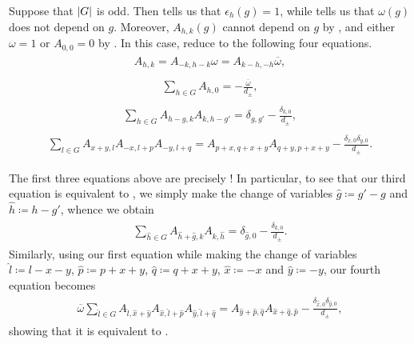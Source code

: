 \noindent\begin{remark} Suppose that $\lvert G\rvert$ is odd. Then \cite[Equation (4.1)]{Izu18} tells us that $\epsilon_h(g) = 1$, while \cite[Equation (4.2)]{Izu18} tells us that $\omega(g)$ does not depend on $g$. Moreover, $A_{h,k}(g)$ cannot depend on $g$ by \cite[Equation (4.5)]{Izu18}, and either $\omega = 1$ or $A_{0,0} = 0$ by \cite[Equation (4.7)]{Izu18}. In this case, \cite[Equations (4.1)--(4.9)]{Izu18} reduce to the following four equations.
\begin{align*}
\begin{split}
A_{h,k} = A_{-k,h-k}\omega = A_{k-h,-h}\overline{\omega},
\end{split}
\end{align*}
\begin{align*}
\begin{split}
\sum_{h \in G} A_{h,0} = -\frac{\overline{\omega}}{d_\pm},
\end{split}
\end{align*}
\begin{align*}
\begin{split}
\sum_{h \in G} A_{h-g,k} A_{k,h-g'} = \delta_{g,g'} - \frac{\delta_{k,0}}{d_\pm},
\end{split}
\end{align*}
\begin{align*}
\begin{split}
\sum_{l \in G} A_{x+y,l} A_{-x,l+p} A_{-y,l+q} = A_{p+x,q+x+y} A_{q+y,p+x+y} - \frac{\delta_{x,0}\delta_{y,0}}{d_\pm}.
\end{split}
\end{align*}
\end{remark}
\noindent The first three equations above are precisely \cite[Equations (4.7)--(4.9)]{EG17}! In particular, to see that our third equation is equivalent to \cite[Equation (4.9)]{EG17}, we simply make the change of variables $\hat{g} \coloneqq g' - g$ and $\hat{h} \coloneqq h - g'$, whence we obtain
\begin{align*}
\begin{split}
\sum_{\hat{h} \in G} A_{\hat{h}+\hat{g},k} A_{k,\hat{h}} = \delta_{\hat{g},0} - \frac{\delta_{k,0}}{d_\pm}.
\end{split}
\end{align*}
\noindent Similarly, using our first equation while making the change of variables $\hat{l} \coloneqq l-x-y$, $\hat{p} \coloneqq p+x+y$, $\hat{q} \coloneqq q+x+y$, $\hat{x} \coloneqq -x$ and $\hat{y} \coloneqq -y$, our fourth equation becomes
\begin{align*}
\begin{split}
\overline{\omega}\sum_{\hat{l} \in G} A_{\hat{l},\hat{x}+\hat{y}} A_{\hat{x},\hat{l}+\hat{p}} A_{\hat{y},\hat{l}+\hat{q}} = A_{\hat{y}+\hat{p},\hat{q}} A_{\hat{x}+\hat{q},\hat{p}} - \frac{\delta_{\hat{x},0}\delta_{\hat{y},0}}{d_\pm},
\end{split}
\end{align*}
\noindent showing that it is equivalent to \cite[Equation (4.11)]{EG17}.
\newpage

